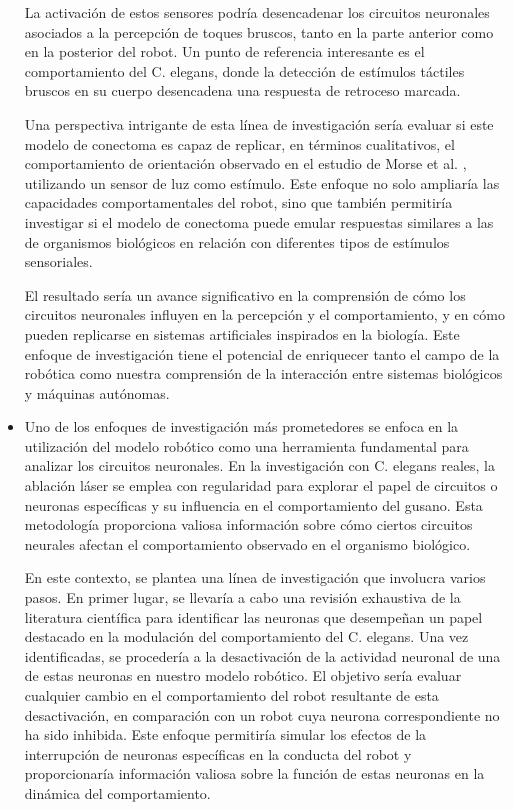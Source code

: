 \begin{itemize}
La activación de estos sensores podría desencadenar los circuitos neuronales asociados a la percepción de toques bruscos, tanto en la parte anterior como en la posterior del robot. Un punto de referencia interesante es el comportamiento del C. elegans, donde la detección de estímulos táctiles bruscos en su cuerpo desencadena una respuesta de retroceso marcada.

Una perspectiva intrigante de esta línea de investigación sería evaluar si este modelo de conectoma es capaz de replicar, en términos cualitativos, el comportamiento de orientación observado en el estudio de Morse et al. \cite{morse_robust_1998}, utilizando un sensor de luz como estímulo. Este enfoque no solo ampliaría las capacidades comportamentales del robot, sino que también permitiría investigar si el modelo de conectoma puede emular respuestas similares a las de organismos biológicos en relación con diferentes tipos de estímulos sensoriales.

El resultado sería un avance significativo en la comprensión de cómo los circuitos neuronales influyen en la percepción y el comportamiento, y en cómo pueden replicarse en sistemas artificiales inspirados en la biología. Este enfoque de investigación tiene el potencial de enriquecer tanto el campo de la robótica como nuestra comprensión de la interacción entre sistemas biológicos y máquinas autónomas.



\item  Uno de los enfoques de investigación más prometedores se enfoca en la utilización del modelo robótico como una herramienta fundamental para analizar los circuitos neuronales. En la investigación con C. elegans reales, la ablación láser se emplea con regularidad para explorar el papel de circuitos o neuronas específicas y su influencia en el comportamiento del gusano. Esta metodología proporciona valiosa información sobre cómo ciertos circuitos neurales afectan el comportamiento observado en el organismo biológico.

En este contexto, se plantea una línea de investigación que involucra varios pasos. En primer lugar, se llevaría a cabo una revisión exhaustiva de la literatura científica para identificar las neuronas que desempeñan un papel destacado en la modulación del comportamiento del C. elegans. Una vez identificadas, se procedería a la desactivación de la actividad neuronal de una de estas neuronas en nuestro modelo robótico. El objetivo sería evaluar cualquier cambio en el comportamiento del robot resultante de esta desactivación, en comparación con un robot cuya neurona correspondiente no ha sido inhibida. Este enfoque permitiría simular los efectos de la interrupción de neuronas específicas en la conducta del robot y proporcionaría información valiosa sobre la función de estas neuronas en la dinámica del comportamiento.


\end{itemize}
